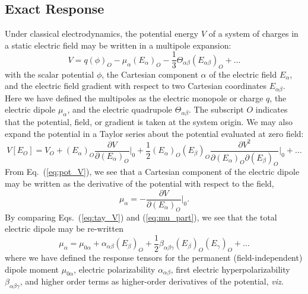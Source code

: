 \subsection{Exact Response} \label{ss:exact}
Under classical electrodynamics, the potential energy $V$ of a system of charges in a static electric field 
may be written in a multipole expansion:\cite{Barron2004}
\begin{equation} \label{eq:pot_V}
V = q(\phi)_O - \mu_\alpha(E_\alpha)_O - \frac{1}{3}\Theta_{\alpha\beta}(E_{\alpha\beta})_O + \ldots
\end{equation}
with the scalar potential $\phi$, 
the Cartesian component $\alpha$ of the electric field $E_\alpha$, and 
the electric field gradient with respect to two Cartesian coordinates $E_{\alpha\beta}$. 
Here we have defined the multipoles as the electric monopole or charge $q$, the electric dipole $\mu_\alpha$, and the electric quadrupole $\Theta_{\alpha\beta}$. 
The subscript $O$ indicates that the potential, field, or gradient is taken at the system origin.
We may also expand the potential in a Taylor series about the potential evaluated at zero field:
\begin{equation} \label{eq:tay_V}
    V[E_O] = V_O + (E_\alpha)_O\frac{\partial V}{\partial (E_\alpha)_O}\Bigr|_0 + \frac{1}{2}(E_\alpha)_O(E_\beta)_O\frac{\partial V^2}{\partial (E_\alpha)_O \partial (E_\beta)_O}\Bigr|_0 + \ldots
\end{equation}
From Eq.~(\ref{eq:pot_V}), we see that a Cartesian component of the electric dipole may be written as the derivative of the potential with respect to the field, 
\begin{equation} \label{eq:mu_part}
    \mu_\alpha = -\frac{\partial V}{\partial (E_\alpha)_O}\Bigr|_0.
\end{equation}
By comparing Eqs.~(\ref{eq:tay_V}) and (\ref{eq:mu_part}), we see that the total electric dipole may be re-written 
\begin{equation} \label{eq:mu_tot}
\mu_\alpha = \mu_{0\alpha} + \alpha_{\alpha\beta}(E_\beta)_O + \frac{1}{2}\beta_{\alpha\beta\gamma}(E_\beta)_O(E_\gamma)_O + \ldots
\end{equation}
where we have defined the response tensors for the permanent (field-independent) dipole moment $\mu_{0\alpha}$, electric polarizability $\alpha_{\alpha\beta}$, first electric hyperpolarizability $\beta_{\alpha\beta\gamma}$, and higher order terms as higher-order derivatives of the potential, \textit{viz.}
